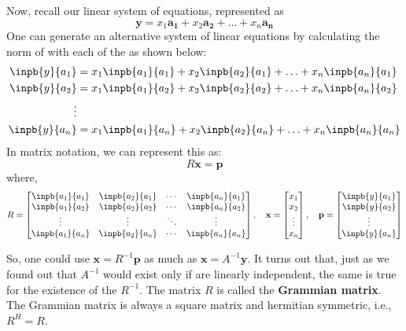 Now, recall our linear system of equations, represented as 
	\[  \mathbf{y} = x_1\mathbf{a_1} + x_2\mathbf{a_2} + \ldots + x_n\mathbf{a_n} \]
One can generate an alternative system of linear equations by calculating the norm of  with each of the  as shown below:
	\begin{align*}
	\inpb{y}{a_1} &= x_1\inpb{a_1}{a_1} + x_2\inpb{a_2}{a_1} + \ldots + x_n\inpb{a_n}{a_1} \\ 
	\inpb{y}{a_2} &= x_1\inpb{a_1}{a_2} + x_2\inpb{a_2}{a_2} + \ldots + x_n\inpb{a_n}{a_2} \\
	\vdots \\
	\inpb{y}{a_n} &= x_1\inpb{a_1}{a_n} + x_2\inpb{a_2}{a_n} + \ldots + x_n\inpb{a_n}{a_n} \\
	\end{align*}
In matrix notation, we can represent this as:
	\[ R\mathbf{x} = \mathbf{p} \]
where,
	\begin{align*}
	R=
	\begin{bmatrix}
	\inpb{a_1}{a_1} & \inpb{a_2}{a_1} & \cdots & \inpb{a_n}{a_1} \\
	\inpb{a_1}{a_2} & \inpb{a_2}{a_2} & \cdots & \inpb{a_n}{a_2} \\
	\vdots & \vdots & \ddots & \vdots \\
	\inpb{a_1}{a_n} & \inpb{a_2}{a_n} & \cdots & \inpb{a_n}{a_n} \\
	\end{bmatrix},\quad
	\mathbf{x}=
	\begin{bmatrix}
	x_1 \\
	x_2 \\
	\vdots \\
	x_n
	\end{bmatrix},\quad
	\mathbf{p}=
	\begin{bmatrix}
	\inpb{y}{a_1} \\
	\inpb{y}{a_2} \\
	\vdots \\
	\inpb{y}{a_n}
	\end{bmatrix}
	\end{align*}

So, one could use \(\mathbf{x} = R^{-1}\mathbf{p}\) as much as \(\mathbf{x} = A^{-1}\mathbf{y}\). It turns out that, just as we found out that \(A^{-1}\) would exist only if  are linearly independent, the same is true for the existence of the \(R^{-1}\). The matrix \(R\) is called the \textbf{Grammian matrix}. The Grammian matrix is always a square matrix and hermitian symmetric, i.e., \(R^H = R\). 


